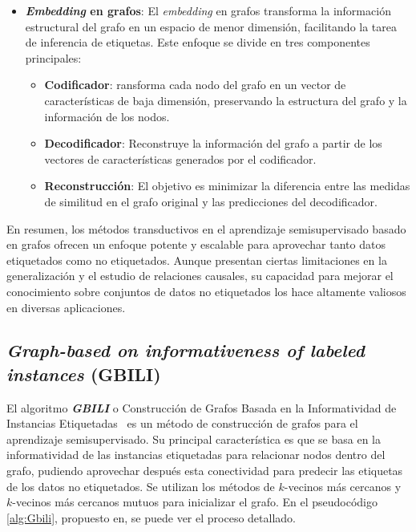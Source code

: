 \begin{itemize}
\begin{itemize}
	\end{itemize}
	\item \textbf{\textit{Embedding} en grafos}: El \textit{embedding} en grafos transforma la información estructural del grafo en un espacio de menor dimensión, facilitando la tarea de inferencia de etiquetas. Este enfoque se divide en tres componentes principales:
	\begin{itemize}
		\item \textbf{Codificador}: ransforma cada nodo del grafo en un vector de características de baja dimensión, preservando la estructura del grafo y la información de los nodos.
		\item \textbf{Decodificador}: Reconstruye la información del grafo a partir de los vectores de características generados por el codificador.
		\item \textbf{Reconstrucción}: El objetivo es minimizar la diferencia entre las medidas de similitud en el grafo original y las predicciones del decodificador.
	\end{itemize}
\end{itemize}

En resumen, los métodos transductivos en el aprendizaje semisupervisado basado en grafos ofrecen un enfoque potente y escalable para aprovechar tanto datos etiquetados como no etiquetados. Aunque presentan ciertas limitaciones en la generalización y el estudio de relaciones causales, su capacidad para mejorar el conocimiento sobre conjuntos de datos no etiquetados los hace altamente valiosos en diversas aplicaciones.
\clearpage
\subsection{\textit{ Graph-based on informativeness of
labeled instances} (GBILI)}\label{sec3:gbili}
El algoritmo \textit{\textbf{GBILI}} o Construcción de Grafos Basada en la Informatividad de Instancias Etiquetadas~\cite{gbili} es un método de construcción de grafos para el aprendizaje semisupervisado. Su principal característica es que se basa en la informatividad de las instancias etiquetadas para relacionar nodos dentro del grafo, pudiendo aprovechar después esta conectividad para predecir las etiquetas de los datos no etiquetados. Se utilizan los métodos de $k$-vecinos más cercanos y  $k$-vecinos más cercanos mutuos para inicializar el grafo. En el pseudocódigo \ref{alg:Gbili}, propuesto en, se puede ver el proceso detallado.

